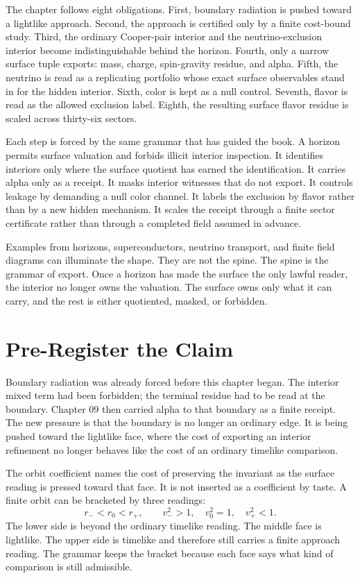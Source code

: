 The chapter follows eight obligations. First, boundary radiation is pushed
toward a lightlike approach. Second, the approach is certified only by a
finite cost-bound study. Third, the ordinary Cooper-pair interior and the
neutrino-exclusion interior become indistinguishable behind the horizon.
Fourth, only a narrow surface tuple exports: mass, charge, spin-gravity
residue, and alpha. Fifth, the neutrino is read as a replicating portfolio
whose exact surface observables stand in for the hidden interior. Sixth,
color is kept as a null control. Seventh, flavor is read as the allowed
exclusion label. Eighth, the resulting surface flavor residue is scaled
across thirty-six sectors.

Each step is forced by the same grammar that has guided the book. A horizon
permits surface valuation and forbids illicit interior inspection. It
identifies interiors only where the surface quotient has earned the
identification. It carries alpha only as a receipt. It masks interior
witnesses that do not export. It controls leakage by demanding a null color
channel. It labels the exclusion by flavor rather than by a new hidden
mechanism. It scales the receipt through a finite sector certificate rather
than through a completed field assumed in advance.

Examples from horizons, superconductors, neutrino transport, and finite
field diagrams can illuminate the shape. They are not the spine. The spine
is the grammar of export. Once a horizon has made the surface the only
lawful reader, the interior no longer owns the valuation. The surface owns
only what it can carry, and the rest is either quotiented, masked, or
forbidden.

\section{Pre-Register the Claim}

Boundary radiation was already forced before this chapter began. The
interior mixed term had been forbidden; the terminal residue had to be read
at the boundary. Chapter 09 then carried alpha to that boundary as a finite
receipt. The new pressure is that the boundary is no longer an ordinary
edge. It is being pushed toward the lightlike face, where the cost of
exporting an interior refinement no longer behaves like the cost of an
ordinary timelike comparison.

The orbit coefficient names the cost of preserving the invariant as the
surface reading is pressed toward that face. It is not inserted as a
coefficient by taste. A finite orbit can be bracketed by three readings:
\[
  r_- < r_0 < r_+,
  \qquad
  v_-^2 > 1,\quad v_0^2 = 1,\quad v_+^2 < 1.
\]
The lower side is beyond the ordinary timelike reading. The middle face is
lightlike. The upper side is timelike and therefore still carries a finite
approach reading. The grammar keeps the bracket because each face says what
kind of comparison is still admissible.

